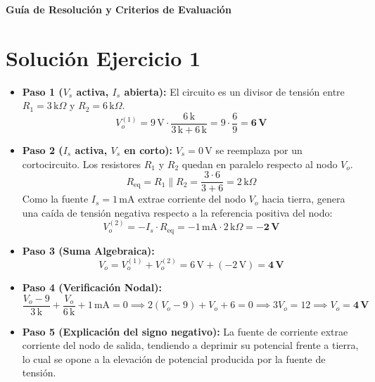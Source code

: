 \documentclass[11pt, a4paper]{article}
\begin{document}
\begin{tcolorbox}[colback=ucbblue!5!white, colframe=ucbblue, title=\textbf{Solucionario: Teorema de Superposición}]
    \centering \large \textbf{Guía de Resolución y Criterios de Evaluación}
\end{tcolorbox}

\section*{Solución Ejercicio 1}
\begin{itemize}
    \item \textbf{Paso 1 ($V_s$ activa, $I_s$ abierta):}
    El circuito es un divisor de tensión entre $R_1 = 3\,\text{k}\Omega$ y $R_2 = 6\,\text{k}\Omega$.
    \begin{equation*}
        V_o^{(1)} = 9\,\text{V} \cdot \frac{6\,\text{k}}{3\,\text{k} + 6\,\text{k}} = 9 \cdot \frac{6}{9} = \mathbf{6\,\text{V}}
    \end{equation*}
    \item \textbf{Paso 2 ($I_s$ activa, $V_s$ en corto):}
    $V_s = 0\,\text{V}$ se reemplaza por un cortocircuito. Los resistores $R_1$ y $R_2$ quedan en paralelo respecto al nodo $V_o$.
    \begin{equation*}
        R_{\text{eq}} = R_1 \parallel R_2 = \frac{3 \cdot 6}{3 + 6} = 2\,\text{k}\Omega
    \end{equation*}
    Como la fuente $I_s = 1\,\text{mA}$ extrae corriente del nodo $V_o$ hacia tierra, genera una caída de tensión negativa respecto a la referencia positiva del nodo:
    \begin{equation*}
        V_o^{(2)} = -I_s \cdot R_{\text{eq}} = -1\,\text{mA} \cdot 2\,\text{k}\Omega = \mathbf{-2\,\text{V}}
    \end{equation*}
    \item \textbf{Paso 3 (Suma Algebraica):}
    \begin{equation*}
        V_o = V_o^{(1)} + V_o^{(2)} = 6\,\text{V} + (-2\,\text{V}) = \mathbf{4\,\text{V}}
    \end{equation*}
    \item \textbf{Paso 4 (Verificación Nodal):}
    \begin{equation*}
        \frac{V_o - 9}{3\,\text{k}} + \frac{V_o}{6\,\text{k}} + 1\,\text{mA} = 0 \implies 2(V_o - 9) + V_o + 6 = 0 \implies 3V_o = 12 \implies V_o = \mathbf{4\,\text{V}}
    \end{equation*}
    \item \textbf{Paso 5 (Explicación del signo negativo):} La fuente de corriente extrae corriente del nodo de salida, tendiendo a deprimir su potencial frente a tierra, lo cual se opone a la elevación de potencial producida por la fuente de tensión.
\end{itemize}
\end{document}
